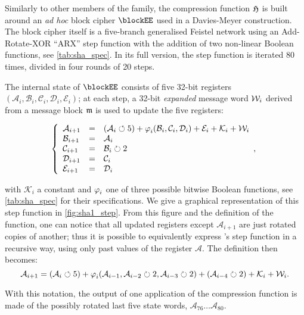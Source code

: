 Similarly to other members of the \mdsha family, the compression function $\operatorname{\mathfrak{H}}$ is built around an \emph{ad hoc} block cipher $\blockEE$ used in a Davies-Meyer construction.
The block cipher itself is a five-branch generalised Feistel network using an Add-Rotate-XOR ``ARX'' step function with the addition of two non-linear Boolean functions, see \autoref{tab:sha_spec}.
In its full version, the step function is iterated 80 times, divided in four rounds of 20 steps.

The internal state of $\blockEE$ consists of five 32-bit registers $(\mathcal{A}_i, \mathcal{B}_i, \mathcal{C}_i, \mathcal{D}_i, \mathcal{E}_i)$; at each step, a 32-bit \emph{expanded} message word $\mathcal{W}_i$ derived from
a message block $\mathfrak{m}$
is used to update the five registers:

\[
\left\{
\begin{array}{lcl}
\mathcal{A}_{i+1} & = & (\mathcal{A}_i \circlearrowleft 5) + \operatorname{\varphi}_i(\mathcal{B}_i,\mathcal{C}_i,\mathcal{D}_i) + \mathcal{E}_i + \mathcal{K}_i + \mathcal{W}_i\\
\mathcal{B}_{i+1} & = & \mathcal{A}_i\\
\mathcal{C}_{i+1} & = & \mathcal{B}_i \circlearrowright 2 \\
\mathcal{D}_{i+1} & = & \mathcal{C}_i \\
\mathcal{E}_{i+1} & = & \mathcal{D}_i \\
\end{array},
\right.	
\]

\noindent with $\mathcal{K}_i$ a constant and $\operatorname{\varphi}_i$ one of three possible bitwise Boolean functions, see \autoref{tab:sha_spec} for their specifications.
We give a graphical representation of this step function in \autoref{fig:sha1_step}.
From this figure and the definition of the function, one can notice that all updated registers except $\mathcal{A}_{i+1}$ are just rotated copies of another;
thus it is possible to equivalently express \shaone's step function in a recursive way, using only past values of the register $\mathcal{A}$. The definition then becomes:
\begin{equation}
\label{eq:rec_step}
\mathcal{A}_{i+1} = (\mathcal{A}_i \circlearrowleft 5) + \operatorname{\varphi}_i(\mathcal{A}_{i-1},\mathcal{A}_{i-2}\circlearrowright 2,\mathcal{A}_{i-3}\circlearrowright 2) + (\mathcal{A}_{i-4}\circlearrowright 2) + \mathcal{K}_i + \mathcal{W}_i.
\end{equation}

\noindent
With this notation, the output of one application of the compression function is made of the possibly rotated last five state words, $\mathcal{A}_{76}\ldots \mathcal{A}_{80}$.

